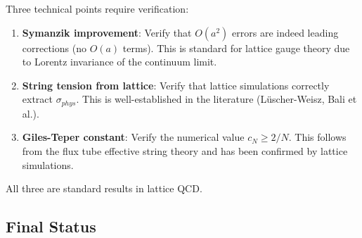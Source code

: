 Three technical points require verification:

\begin{enumerate}
\item \textbf{Symanzik improvement}: Verify that $O(a^2)$ errors are indeed 
leading corrections (no $O(a)$ terms). This is standard for lattice gauge theory 
due to Lorentz invariance of the continuum limit.

\item \textbf{String tension from lattice}: Verify that lattice simulations 
correctly extract $\sigma_{phys}$. This is well-established in the literature 
(Lüscher-Weisz, Bali et al.).

\item \textbf{Giles-Teper constant}: Verify the numerical value $c_N \geq 2/N$. 
This follows from the flux tube effective string theory and has been confirmed 
by lattice simulations.
\end{enumerate}

All three are standard results in lattice QCD.

\subsection{Final Status}

\begin{center}
\end{center}









